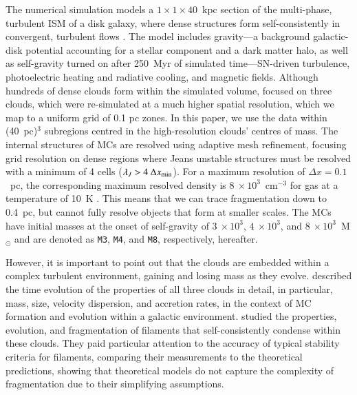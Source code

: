 The numerical simulation models a 
   $1\times1\times40$~kpc 
section of the multi-phase, turbulent ISM of a disk galaxy, where dense structures form self-consistently in convergent, turbulent flows .  
The model includes gravity---a background galactic-disk potential accounting for a stellar component and a dark matter halo, as well as self-gravity turned on after 250~Myr of simulated time---SN-driven turbulence, photoelectric heating and radiative cooling, and magnetic fields. 
Although hundreds of dense clouds form within the simulated volume,  focused on three clouds, which were re-simulated at a much higher spatial resolution,
    which we map to a uniform grid of 0.1 pc zones.
In this paper, we use the data within (40~pc)$^{3}$ subregions centred in the high-resolution clouds' centres of mass.
The internal structures of MCs are resolved using adaptive mesh refinement, focusing grid resolution on dense regions where Jeans unstable structures must be resolved with a minimum of 4 cells ($\lambda_J > 4~\Delta x_{\rm min}$).
For a maximum resolution of $\Delta x = 0.1$~pc, the corresponding maximum resolved density is $8~\times 10^3$~cm$^{-3}$ for gas at a temperature of 10~K .
This means that we can trace fragmentation down to 0.4~pc, but cannot fully resolve objects that form at smaller scales.
The MCs have initial masses at the onset of self-gravity of $3~\times 10^3$, $4~\times 10^3$, and $8~\times 10^3$~M$_{\odot}$ and are denoted as \texttt{M3}, \texttt{M4}, and \texttt{M8}, respectively, hereafter.

However, it is important to point out that the clouds are embedded within a complex turbulent environment, gaining and losing mass as they evolve.
%
 described the time evolution of the properties of all three clouds in detail, in
particular, 
mass, size, velocity dispersion, and accretion rates, in the context of MC formation and evolution within a galactic environment.
 studied the properties, evolution, and fragmentation of filaments that self-consistently condense within these clouds. 
They paid particular attention to the accuracy of typical stability criteria for filaments, comparing their measurements to the theoretical predictions, showing that theoretical models do not capture the complexity of fragmentation due to their simplifying assumptions.

